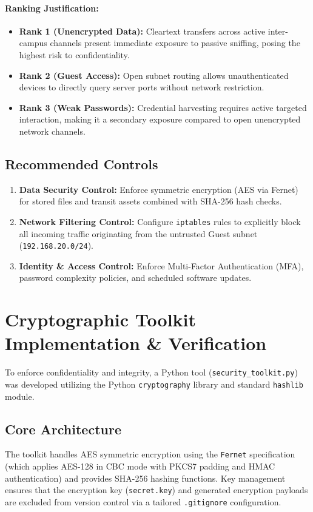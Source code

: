 \documentclass[12pt,a4paper]{article}
\begin{document}
\paragraph{Ranking Justification:}
\begin{itemize}
    \item \textbf{Rank 1 (Unencrypted Data):} Cleartext transfers across active inter-campus channels present immediate exposure to passive sniffing, posing the highest risk to confidentiality.
    \item \textbf{Rank 2 (Guest Access):} Open subnet routing allows unauthenticated devices to directly query server ports without network restriction.
    \item \textbf{Rank 3 (Weak Passwords):} Credential harvesting requires active targeted interaction, making it a secondary exposure compared to open unencrypted network channels.
\end{itemize}

\subsection{Recommended Controls}
\begin{enumerate}
    \item \textbf{Data Security Control:} Enforce symmetric encryption (AES via Fernet) for stored files and transit assets combined with SHA-256 hash checks.
    \item \textbf{Network Filtering Control:} Configure \texttt{iptables} rules to explicitly block all incoming traffic originating from the untrusted Guest subnet (\texttt{192.168.20.0/24}).
    \item \textbf{Identity \& Access Control:} Enforce Multi-Factor Authentication (MFA), password complexity policies, and scheduled software updates.
\end{enumerate}

\section{Cryptographic Toolkit Implementation \& Verification}

To enforce confidentiality and integrity, a Python tool (\texttt{security\_toolkit.py}) was developed utilizing the Python \texttt{cryptography} library and standard \texttt{hashlib} module.

\subsection{Core Architecture}
The toolkit handles AES symmetric encryption using the \texttt{Fernet} specification (which applies AES-128 in CBC mode with PKCS7 padding and HMAC authentication) and provides SHA-256 hashing functions. Key management ensures that the encryption key (\texttt{secret.key}) and generated encryption payloads are excluded from version control via a tailored \texttt{.gitignore} configuration.
\end{document}
